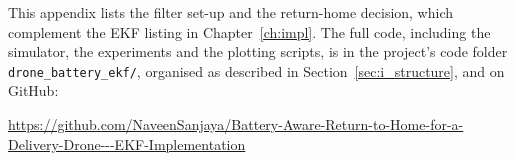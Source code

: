 %

This appendix lists the filter set-up and the return-home decision, which complement the EKF listing in Chapter~\ref{ch:impl}. The full code, including the simulator, the experiments and the plotting scripts, is in the project's code folder \texttt{drone\_battery\_ekf/}, organised as described in Section~\ref{sec:i_structure}, and on GitHub:
\begin{center}
\url{https://github.com/NaveenSanjaya/Battery-Aware-Return-to-Home-for-a-Delivery-Drone---EKF-Implementation}
\end{center}


